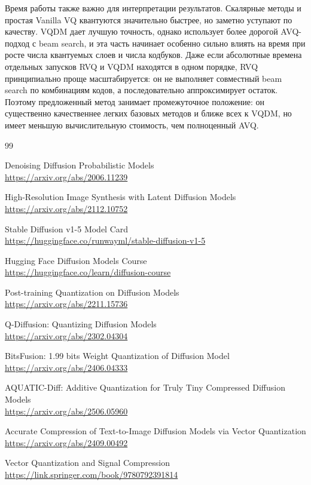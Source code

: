 \documentclass[a4paper,12pt]{article}
\newcommand{\biburl}[1]{\\\mbox{\url{#1}}}
\begin{document}
Время работы также важно для интерпретации результатов. Скалярные методы и простая Vanilla VQ квантуются значительно быстрее, но заметно уступают по качеству. VQDM дает лучшую точность, однако использует более дорогой AVQ-подход с beam search, и эта часть начинает особенно сильно влиять на время при росте числа квантуемых слоев и числа кодбуков. Даже если абсолютные времена отдельных запусков RVQ и VQDM находятся в одном порядке, RVQ принципиально проще масштабируется: он не выполняет совместный beam search по комбинациям кодов, а последовательно аппроксимирует остаток. Поэтому предложенный метод занимает промежуточное положение: он существенно качественнее легких базовых методов и ближе всех к VQDM, но имеет меньшую вычислительную стоимость, чем полноценный AVQ.

\newpage
{}
\begin{thebibliography}{99}

Denoising Diffusion Probabilistic Models\biburl{https://arxiv.org/abs/2006.11239}

High-Resolution Image Synthesis with Latent Diffusion Models\biburl{https://arxiv.org/abs/2112.10752}

Stable Diffusion v1-5 Model Card\biburl{https://huggingface.co/runwayml/stable-diffusion-v1-5}

Hugging Face Diffusion Models Course\biburl{https://huggingface.co/learn/diffusion-course}

Post-training Quantization on Diffusion Models\biburl{https://arxiv.org/abs/2211.15736}

Q-Diffusion: Quantizing Diffusion Models\biburl{https://arxiv.org/abs/2302.04304}

BitsFusion: 1.99 bits Weight Quantization of Diffusion Model\biburl{https://arxiv.org/abs/2406.04333}

AQUATIC-Diff: Additive Quantization for Truly Tiny Compressed Diffusion Models\biburl{https://arxiv.org/abs/2506.05960}

Accurate Compression of Text-to-Image Diffusion Models via Vector Quantization\biburl{https://arxiv.org/abs/2409.00492}

Vector Quantization and Signal Compression\biburl{https://link.springer.com/book/9780792391814}

\end{thebibliography}
\end{document}
